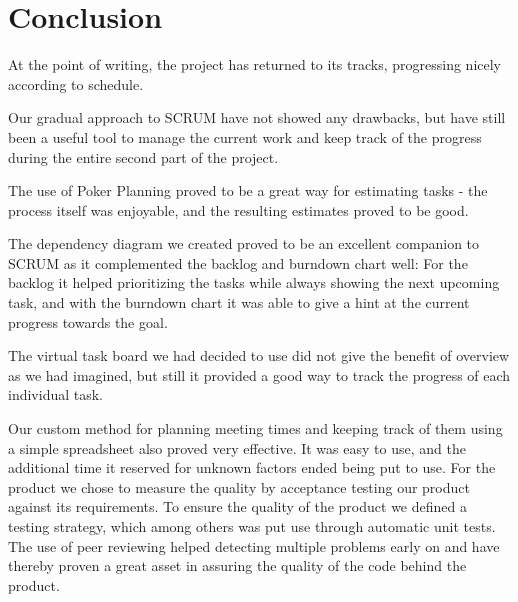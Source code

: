 \section{Conclusion}
At the point of writing, the project has returned to its tracks, progressing nicely according to schedule.

Our gradual approach to SCRUM have not showed any drawbacks, but have still been a useful tool to manage the current work and keep track of the progress during the entire second part of the project.

The use of Poker Planning proved to be a great way for estimating tasks - the process itself was enjoyable, and the resulting estimates proved to be good.

The dependency diagram we created proved to be an excellent companion to SCRUM as it complemented the backlog and burndown chart well: For the backlog it helped prioritizing the tasks while always showing the next upcoming task, and with the burndown chart it was able to give a hint at the current progress towards the goal.

The virtual task board we had decided to use did not give the benefit of overview as we had imagined, but still it provided a good way to track the progress of each individual task.

Our custom method for planning meeting times and keeping track of them using a simple spreadsheet also proved very effective. It was easy to use, and the additional time it reserved for unknown factors ended being put to use.
\newpage
For the product we chose to measure the quality by acceptance testing our product against its requirements.
To ensure the quality of the product we defined a testing strategy, which among others was put use through automatic unit tests. The use of peer reviewing helped detecting multiple problems early on and have thereby proven a great asset in assuring the quality of the code behind the product.
\newpage